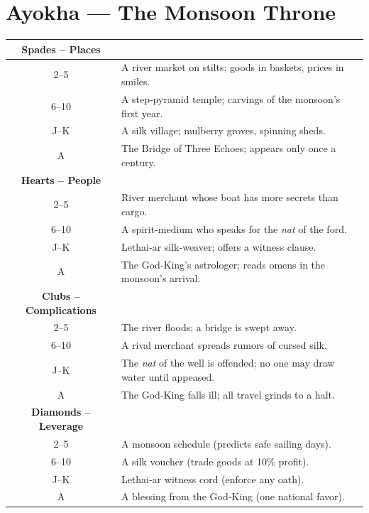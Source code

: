 \documentclass[12pt]{book}
\begin{document}
\section{Ayokha --- The Monsoon Throne}
\begin{longtable}{c X}
\toprule
\textbf{Spades -- Places} & \\
\midrule
2--5   & A river market on stilts; goods in baskets, prices in smiles. \\
6--10 & A step‑pyramid temple; carvings of the monsoon's first year. \\
J--K  & A silk village; mulberry groves, spinning sheds. \\
A    & The Bridge of Three Echoes; appears only once a century. \\
\midrule
\textbf{Hearts -- People} & \\
\midrule
2--5   & River merchant whose boat has more secrets than cargo. \\
6--10 & A spirit‑medium who speaks for the \textit{nat} of the ford. \\
J--K  & Lethai‑ar silk‑weaver; offers a witness clause. \\
A    & The God‑King's astrologer; reads omens in the monsoon's arrival. \\
\midrule
\textbf{Clubs -- Complications} & \\
\midrule
2--5   & The river floods; a bridge is swept away. \\
6--10 & A rival merchant spreads rumors of cursed silk. \\
J--K  & The \textit{nat} of the well is offended; no one may draw water until appeased. \\
A    & The God‑King falls ill; all travel grinds to a halt. \\
\midrule
\textbf{Diamonds -- Leverage} & \\
\midrule
2--5   & A monsoon schedule (predicts safe sailing days). \\
6--10 & A silk voucher (trade goods at 10\% profit). \\
J--K  & Lethai‑ar witness cord (enforce any oath). \\
A    & A blessing from the God‑King (one national favor). \\
\bottomrule
\end{longtable}
\end{document}
